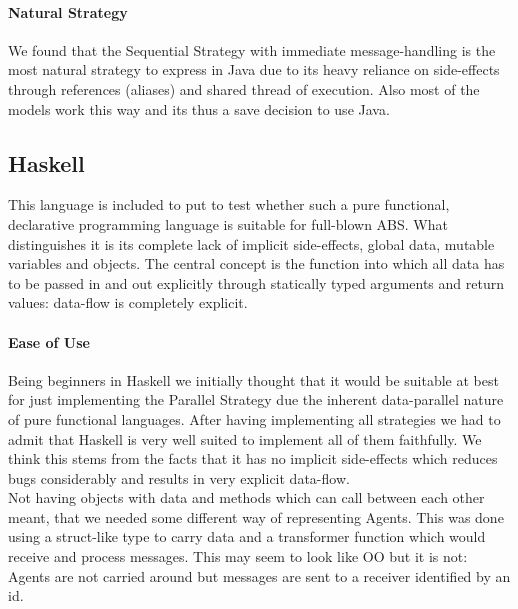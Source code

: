 \paragraph{Natural Strategy}
We found that the Sequential Strategy with immediate message-handling is the most natural strategy to express in Java due to its heavy reliance on side-effects through references (aliases) and shared thread of execution. Also most of the models work this way and its thus a save decision to use Java.





 
\subsection{Haskell}
This language is included to put to test whether such a pure functional, declarative programming language is suitable for full-blown ABS. What distinguishes it is its complete lack of implicit side-effects, global data, mutable variables and objects. The central concept is the function into which all data has to be passed in and out explicitly through statically typed arguments and return values: data-flow is completely explicit.

\paragraph{Ease of Use}
Being beginners in Haskell we initially thought that it would be suitable at best for just implementing the Parallel Strategy due the inherent data-parallel nature of pure functional languages. After having implementing all strategies we had to admit that Haskell is very well suited to implement all of them faithfully. We think this stems from the facts that it has no implicit side-effects which reduces bugs considerably and results in very explicit data-flow. \\

Not having objects with data and methods which can call between each other meant, that we needed some different way of representing Agents. This was done using a struct-like type to carry data and a transformer function which would receive and process messages. This may seem to look like OO but it is not: Agents are not carried around but messages are sent to a receiver identified by an id.

